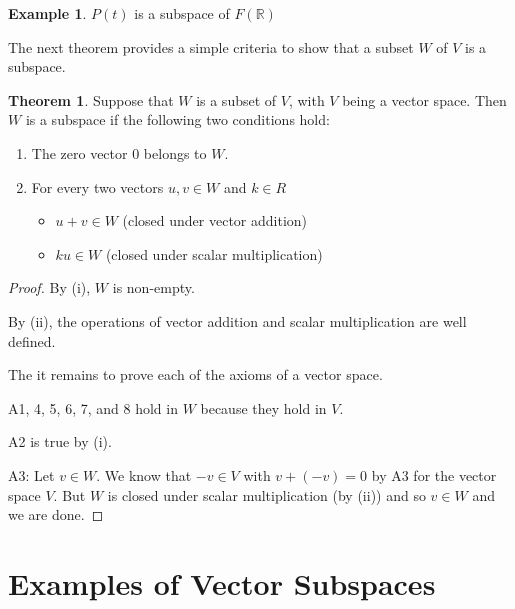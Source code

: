 \documentclass{report}
\theoremstyle{definition}
\newtheorem{_thm}{Theorem}[section]
\newtheorem{ex}{Example}[section]
\theoremstyle{remark}
\begin{document}
\begin{ex}
$P(t)$ is a subspace of $F(\mathbb{R})$
\end{ex}

The next theorem provides a simple criteria to show that a subset $W$ of $V$ is a subspace.

\begin{_thm}
Suppose that $W$ is a subset of $V$, with $V$ being a vector space. Then $W$ is a subspace if the following two conditions hold:
\begin{enumerate}[i]
 \item The zero vector $0$ belongs to $W$.
 \item For every two vectors $u,v\in W$ and $k\in R$
 \begin{itemize}
  \item $u+v\in W$ (closed under vector addition)
  \item $ku\in W$ (closed under scalar multiplication)
 \end{itemize}
\end{enumerate}
\end{_thm}

\begin{proof}
By (i), $W$ is non-empty.

By (ii), the operations of vector addition and scalar multiplication are well defined.

The it remains to prove each of the axioms of a vector space.

A1, 4, 5, 6, 7, and 8 hold in $W$ because they hold in $V$.

A2 is true by (i).

A3: Let $v\in W$.
We know that $-v\in V$ with $v+(-v)=0$ by A3 for the vector space $V$.
But $W$ is closed under scalar multiplication (by (ii)) and so $v\in W$ and we are done.
\end{proof}

\section{Examples of Vector Subspaces}
\end{document}
